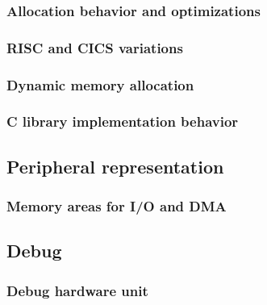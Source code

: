 \documentclass[../main.tex]{subfiles}
\begin{document}
\subsubsection{Allocation behavior and optimizations}
\subsubsection{RISC and CICS variations}
\subsubsection{Dynamic memory allocation}
\subsubsection{C library implementation behavior}



\subsection{Peripheral representation}

\subsubsection{Memory areas for I/O and DMA}

\subsection{Debug}

\subsubsection{Debug hardware unit}
\end{document}
